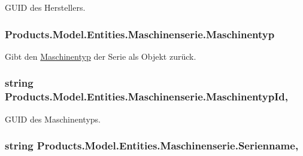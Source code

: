G\+U\+ID des Herstellers. 

\subsubsection[{\texorpdfstring{Maschinentyp}{Maschinentyp}}]{ Products.\+Model.\+Entities.\+Maschinenserie.\+Maschinentyp\hspace{0.3cm}{\ttfamily [get]}}\hypertarget{class_products_1_1_model_1_1_entities_1_1_maschinenserie_a7b7d035157571df060a82b0fbd06073e}{}\label{class_products_1_1_model_1_1_entities_1_1_maschinenserie_a7b7d035157571df060a82b0fbd06073e}


Gibt den \hyperlink{class_products_1_1_model_1_1_entities_1_1_maschinentyp}{Maschinentyp} der Serie als Objekt zurück. 

\subsubsection[{\texorpdfstring{Maschinentyp\+Id}{MaschinentypId}}]{\setlength{\rightskip}{0pt plus 5cm}string Products.\+Model.\+Entities.\+Maschinenserie.\+Maschinentyp\+Id\hspace{0.3cm}{\ttfamily [get]}, {\ttfamily [set]}}\hypertarget{class_products_1_1_model_1_1_entities_1_1_maschinenserie_af944d81c3bc2d93ad7c58186900ce9bc}{}\label{class_products_1_1_model_1_1_entities_1_1_maschinenserie_af944d81c3bc2d93ad7c58186900ce9bc}


G\+U\+ID des Maschinentyps. 

\subsubsection[{\texorpdfstring{Serienname}{Serienname}}]{\setlength{\rightskip}{0pt plus 5cm}string Products.\+Model.\+Entities.\+Maschinenserie.\+Serienname\hspace{0.3cm}{\ttfamily [get]}, {\ttfamily [set]}}\hypertarget{class_products_1_1_model_1_1_entities_1_1_maschinenserie_a9eb8e1bddad0fdc7835c6cabd2ec269f}{}\label{class_products_1_1_model_1_1_entities_1_1_maschinenserie_a9eb8e1bddad0fdc7835c6cabd2ec269f}


